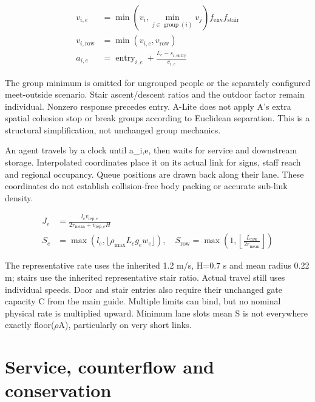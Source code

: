 \documentclass[11pt,a4paper]{article}
\begin{document}
\begin{equation}
\begin{aligned}
v_{i,e}&=\min\!\left(v_i,\min_{j\in\operatorname{group}(i)}v_j\right)f_{\mathrm{env}}f_{\mathrm{stair}} \\
v_{i,\mathrm{row}}&=\min(v_{i,e},v_{\mathrm{row}}) \\
a_{i,e}&=\operatorname{entry}_{i,e}+\frac{L_e-s_{i,\mathrm{entry}}}{v_{i,e}}
\end{aligned}
\tag{L1}\label{eq:L1}
\end{equation}

The group minimum is omitted for ungrouped people or the separately configured meet-outside scenario. Stair ascent/descent ratios and the outdoor factor remain individual. Nonzero response precedes entry. A-Lite does not apply A's extra spatial cohesion stop or break groups according to Euclidean separation. This is a structural simplification, not unchanged group mechanics.


An agent travels by a clock until a\_i,e, then waits for service and downstream storage. Interpolated coordinates place it on its actual link for signs, staff reach and regional occupancy. Queue positions are drawn back along their lane. These coordinates do not establish collision-free body packing or accurate sub-link density.


\begin{equation}
\begin{aligned}
J_e&=\frac{l_ev_{\mathrm{rep},e}}{2r_{\mathrm{mean}}+v_{\mathrm{rep},e}H} \\
S_e&=\max\!\left(l_e,\lfloor\rho_{\max}L_eg_ew_e\rfloor\right),\quad
S_{\mathrm{row}}=\max\!\left(1,\left\lfloor\frac{L_{\mathrm{row}}}{2r_{\mathrm{mean}}}\right\rfloor\right)
\end{aligned}
\tag{L2}\label{eq:L2}
\end{equation}

The representative rate uses the inherited 1.2 m/s, H=0.7 s and mean radius 0.22 m; stairs use the inherited representative stair ratio. Actual travel still uses individual speeds. Door and stair entries also require their unchanged gate capacity C from the main guide. Multiple limits can bind, but no nominal physical rate is multiplied upward. Minimum lane slots mean S is not everywhere exactly floor(\ensuremath{\rho}A), particularly on very short links.


\section{Service, counterflow and conservation}
\end{document}
